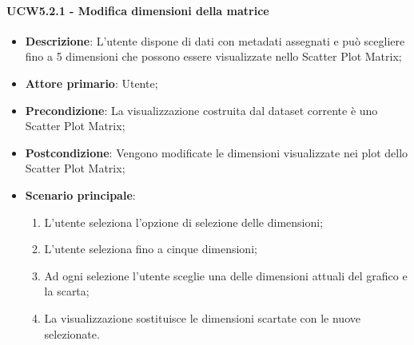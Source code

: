 \paragraph{UCW5.2.1 - Modifica dimensioni della matrice}
\label{par:ucw5.2.1}
\begin{itemize}
    \item \textbf{Descrizione}:     L’utente dispone di dati con metadati assegnati e può
          scegliere fino a 5 dimensioni che possono essere visualizzate nello Scatter Plot
          Matrix;

    \item \textbf{Attore primario}: Utente;

    \item \textbf{Precondizione}:   La visualizzazione costruita dal dataset corrente è uno Scatter Plot Matrix;
    \item \textbf{Postcondizione}:  Vengono modificate le dimensioni visualizzate nei plot dello Scatter Plot Matrix;

    \item \textbf{Scenario principale}:
          \begin{enumerate}
              \item   L'utente seleziona l'opzione di selezione delle dimensioni;
              \item   L'utente seleziona fino a cinque dimensioni;

              \item   Ad ogni selezione l'utente
                    sceglie una delle dimensioni attuali del grafico e la scarta;

              \item   La visualizzazione sostituisce le dimensioni scartate con le nuove selezionate.
          \end{enumerate}
\end{itemize}

